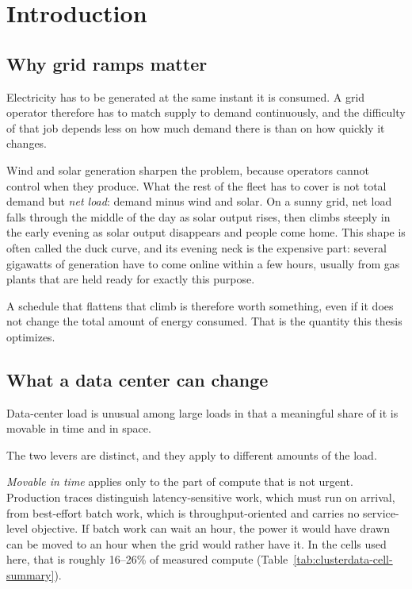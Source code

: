 ﻿\documentclass[12pt]{article}
\begin{document}
\section{Introduction}
\label{sec:introduction}

\subsection{Why grid ramps matter}
\label{subsec:intro-ramps}

Electricity has to be generated at the same instant it is consumed. A grid
operator therefore has to match supply to demand continuously, and the
difficulty of that job depends less on how much demand there is than on how
quickly it changes.

Wind and solar generation sharpen the problem, because operators cannot control
when they produce. What the rest of the fleet has to cover is not total demand
but \emph{net load}: demand minus wind and solar. On a sunny grid, net load
falls through the middle of the day as solar output rises, then climbs steeply
in the early evening as solar output disappears and people come home. This
shape is often called the duck curve, and its evening neck is the expensive
part: several gigawatts of generation have to come online within a few hours,
usually from gas plants that are held ready for exactly this purpose.

A schedule that flattens that climb is therefore worth something, even if it
does not change the total amount of energy consumed. That is the quantity this
thesis optimizes.

\subsection{What a data center can change}
\label{subsec:intro-flexibility}

Data-center load is unusual among large loads in that a meaningful share of it
is movable in time and in space.

The two levers are distinct, and they apply to different amounts of the load.

\emph{Movable in time} applies only to the part of compute that is not urgent.
Production traces distinguish latency-sensitive work, which must run on arrival,
from best-effort batch work, which is throughput-oriented and carries no
service-level objective. If batch work can wait an hour, the power it would have
drawn can be moved to an hour when the grid would rather have it. In the cells
used here, that is roughly 16--26\% of measured compute
(Table~\ref{tab:clusterdata-cell-summary}).
\end{document}
